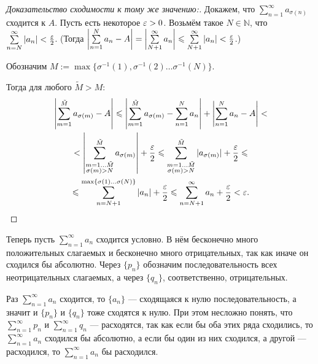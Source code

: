 	\begin{proof} [Доказательство сходимости к тому же значению:]		
		Докажем, что $\sum\limits_{n=1}^{\infty}a_{\sigma(n)}$ сходится к $A$. Пусть есть некоторое $\varepsilon>0$. Возьмём такое $N\in \mathbb{N}$, что $\sum\limits_{n=N}^{\infty}|a_{n}| < \frac{\varepsilon}{2}$. (Тогда $\left| \sum\limits_{n=1}^{N}a_{n} - A\right| = \left| \sum\limits_{N+1}^{\infty}a_{n}\right| \leqslant \sum\limits_{N+1}^{\infty}|a_{n}| < \frac{\varepsilon}{2}$.) 
		
		Обозначим $M := \max\{ \sigma^{-1}(1), \sigma^{-1}(2)\dots \sigma^{-1}(N)\}$.
		 
		Тогда для любого $\tilde{M}>M$:
		\begin{multline}
		 \left| \sum\limits_{m=1}^{\tilde{M}}a_{\sigma(m)} - A \right|\leqslant \left| \sum\limits_{m=1}^{\tilde{M}}a_{\sigma(m)} - \sum\limits_{n=1}^{N}a_{n} \right| + \left| \sum\limits_{n=1}^{N}a_{n} - A \right| < \\ < \left| \sum\limits_{\substack{m=1\dots \tilde{M}\\ \sigma(m)>N} }^{\tilde{M}}a_{\sigma(m)}\right| + \frac{\varepsilon}{2} \leqslant   \sum\limits_{\substack {m=1\dots \tilde{M} \\ \sigma(m)>N} }^{\tilde{M}}|a_{\sigma(m)}| + \frac{\varepsilon}{2} \leqslant \\ \leqslant \sum\limits_{n=N+1}^{\max\{ \sigma(1)\dots \sigma(N)\}}|a_n| + \frac{\varepsilon}{2} \leqslant \sum\limits_{n=N+1}^{\infty}a_{n} +  \frac{\varepsilon}{2} < \varepsilon.
		 \end{multline}	
	\end{proof}
	
	
	Теперь пусть $\sum\limits_{n=1}^{\infty}a_n$ сходится условно. В нём бесконечно много положительных слагаемых и бесконечно много отрицательных, так как иначе он сходился бы абсолютно. Через $\{p_n\}$ обозначим последовательность всех неотрицательных слагаемых, а через $\{q_n\}$, соответственно, отрицательных. 
	
	Раз $\sum\limits_{n=1}^{\infty}a_n$ сходится, то $\{a_n\}$ --- сходящаяся к нулю последовательность, а значит и $\{p_n\}$ и $\{q_n\}$ тоже сходятся  к нулю.
	При этом несложно понять, что $\sum\limits_{n=1}^{\infty}p_n$ и $\sum\limits_{n=1}^{\infty}q_n$ --- расходятся, так как если бы оба этих ряда сходились, то $\sum\limits_{n=1}^{\infty}a_n$ сходился бы абсолютно, а если бы один из них сходился, а другой --- расходился, то  $\sum\limits_{n=1}^{\infty}a_n$ бы расходился.
	
